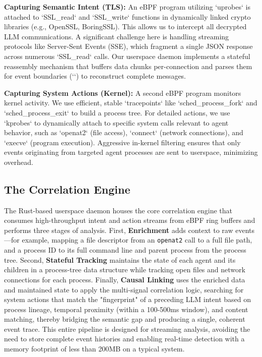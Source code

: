 \textbf{Capturing Semantic Intent (TLS):} An eBPF program utilizing `uprobes` is attached to `SSL_read` and `SSL_write` functions in dynamically linked crypto libraries (e.g., OpenSSL, BoringSSL). This allows us to intercept all decrypted LLM communications. A significant challenge here is handling streaming protocols like Server-Sent Events (SSE), which fragment a single JSON response across numerous `SSL_read` calls. Our userspace daemon implements a stateful reassembly mechanism that buffers data chunks per-connection and parses them for event boundaries (`\n\n`) to reconstruct complete messages.

\textbf{Capturing System Actions (Kernel):} A second eBPF program monitors kernel activity. We use efficient, stable `tracepoints` like `sched_process_fork` and `sched_process_exit` to build a process tree. For detailed actions, we use `kprobes` to dynamically attach to specific system calls relevant to agent behavior, such as `openat2` (file access), `connect` (network connections), and `execve` (program execution). Aggressive in-kernel filtering ensures that only events originating from targeted agent processes are sent to userspace, minimizing overhead.

\subsection{The Correlation Engine}
The Rust-based userspace daemon houses the core correlation engine that consumes high-throughput intent and action streams from eBPF ring buffers and performs three stages of analysis. First, \textbf{Enrichment} adds context to raw events—for example, mapping a file descriptor from an \texttt{openat2} call to a full file path, and a process ID to its full command line and parent process from the process tree. Second, \textbf{Stateful Tracking} maintains the state of each agent and its children in a process-tree data structure while tracking open files and network connections for each process. Finally, \textbf{Causal Linking} uses the enriched data and maintained state to apply the multi-signal correlation logic, searching for system actions that match the "fingerprint" of a preceding LLM intent based on process lineage, temporal proximity (within a 100-500ms window), and content matching, thereby bridging the semantic gap and producing a single, coherent event trace. This entire pipeline is designed for streaming analysis, avoiding the need to store complete event histories and enabling real-time detection with a memory footprint of less than 200MB on a typical system. 